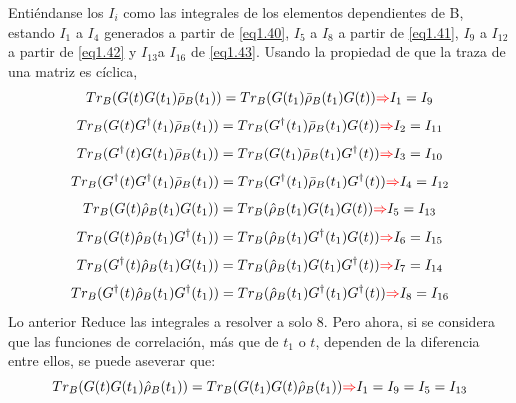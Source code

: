 \documentclass{book}
\begin{document}
 Entiéndanse los $I_i$ como las integrales de los elementos dependientes de B, estando $I_1$ a $I_4$ generados a partir de \textcolor{blue}{\ref{eq1.40}}, $I_5$ a $I_8$ a partir de \textcolor{blue}{\ref{eq1.41}}, $I_9$ a $I_{12}$ a partir de \textcolor{blue}{\ref{eq1.42}} y $I_{13}$a $I_{16}$ de \textcolor{blue}{\ref{eq1.43}}.
 Usando la propiedad de que la traza de una matriz es cíclica, 
 \begin{equation}\label{eq1.45} {Tr_B(G(t)G(t_1)\bar{\rho}_B(t_1))=Tr_B(G(t_1)\bar{\rho}_B(t_1)G(t))\textcolor{red}{\Rightarrow} I_{1}=I_{9} }\end{equation}
 \begin{equation}\label{eq1.46} {Tr_B(G(t)G^\dag(t_1)\bar{\rho}_B(t_1))=Tr_B(G^\dag(t_1)\bar{\rho}_B(t_1)G(t))\textcolor{red}{\Rightarrow} I_{2}=I_{11}}\end{equation}
 \begin{equation}\label{eq1.47}{ Tr_B(G^\dag(t)G(t_1)\bar{\rho}_B(t_1))=Tr_B(G(t_1)\bar{\rho}_B(t_1)G^\dag(t))\textcolor{red}{\Rightarrow} I_{3}=I_{10} }\end{equation}
 \begin{equation}\label{eq1.48}{Tr_B(G^\dag(t)G^\dag(t_1)\bar{\rho}_B(t_1))=Tr_B(G^\dag(t_1)\bar{\rho}_B(t_1)G^\dag(t))\textcolor{red}{\Rightarrow} I_{4}=I_{12}}\end{equation}
 \begin{equation} \label{eq1.49}{ Tr_B(G(t)\hat{\rho}_B(t_1)G(t_1))=Tr_B(\hat{\rho}_B(t_1)G(t_1)G(t)) \textcolor{red}{\Rightarrow} I_{5}=I_{13}
}\end{equation}
\begin{equation}\label{eq1.50} {Tr_B(G(t)\hat{\rho}_B(t_1)G^\dag(t_1))=Tr_B(\hat{\rho}_B(t_1)G^\dag(t_1)G(t)) \textcolor{red}{\Rightarrow} I_{6}=I_{15} }\end{equation}
\begin{equation}\label{eq1.51}{Tr_B(G^\dag(t)\hat{\rho}_B(t_1)G(t_1))=Tr_B(\hat{\rho}_B(t_1)G(t_1)G^\dag(t)) \textcolor{red}{\Rightarrow} I_{7}=I_{14}}\end{equation}
\begin{equation}\label{eq1.52} {Tr_B(G^\dag(t)\hat{\rho}_B(t_1)G^\dag(t_1))=Tr_B(\hat{\rho}_B(t_1)G^\dag(t_1)G^\dag(t)) \textcolor{red}{\Rightarrow} I_{8}=I_{16} }\end{equation}
 Lo anterior Reduce las integrales a resolver a solo 8. Pero ahora, si se considera que las funciones de correlación, más que de $t_1$ o $t$, dependen de la diferencia entre ellos, se puede aseverar que:
 \begin{equation}\label{eq1.53}{Tr_B(G(t)G(t_1)\hat{\rho}_B(t_1))=Tr_B(G(t_1)G(t)\hat{\rho}_B(t_1)) \textcolor{red}{\Rightarrow} I_1=I_9=I_5=I_{13}}\end{equation}
\end{document}
